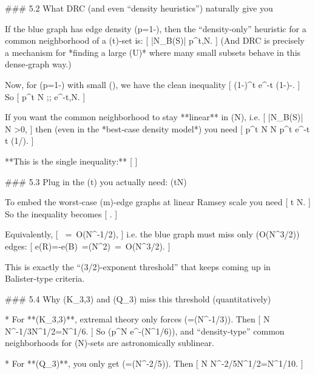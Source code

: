 ### 5.2 What DRC (and even “density heuristics”) naturally give you

If the blue graph has edge density (p=1-\varepsilon), then the “density‑only” heuristic for a common neighborhood of a (t)-set is:
[
|N_B(S)| \approx p^{t},N.
]
(And DRC is precisely a mechanism for *finding a large (U)* where many small subsets behave in this dense‑graph way.)

Now, for (p=1-\varepsilon) with small (\varepsilon), we have the clean inequality
[
(1-\varepsilon)^t \le e^{-\varepsilon t}
\quad{}\ln(1-\varepsilon)\le -\varepsilon\text{)}.
]
So
[
p^{t} N ;\le; e^{-\varepsilon t},N.
]

If you want the common neighborhood to stay **linear** in (N), i.e.
[
|N_B(S)| \ge \alpha N \quad{}\alpha>0,
]
then (even in the *best‑case density model*) you need
[
p^t N \gtrsim \alpha N
\quad\Longrightarrow\quad
p^t \gtrsim \alpha
\quad\Longrightarrow\quad
e^{-\varepsilon t}\gtrsim \alpha
\quad\Longrightarrow\quad
\varepsilon t \lesssim \log(1/\alpha).
]

**This is the single inequality:**
[
\qquad{}
]

### 5.3 Plug in the (t) you actually need: (t\asymp \sqrt N)

To embed the worst‑case (m)-edge graphs at linear Ramsey scale you need
[
t \asymp \sqrt N.
]
So the inequality becomes
[
.
]

Equivalently,
[
\varepsilon \ =\ O(N^{-1/2}),
]
i.e. the blue graph must miss only (O(N^{3/2})) edges:
[
e(R)=-e(B)\ =\Theta(\varepsilon N^2)\ =\ O(N^{3/2}).
]

This is exactly the “(3/2)-exponent threshold” that keeps coming up in Balister‑type criteria.

### 5.4 Why (K_{3,3}) and (Q_3) miss this threshold (quantitatively)

* For **(K_{3,3})**, extremal theory only forces (\varepsilon=\Theta(N^{-1/3})).
  Then
  [
  \varepsilon\sqrt N \asymp N^{-1/3}\cdot N^{1/2}=N^{1/6}\to\infty.
  ]
  So (p^{\sqrt N} \le e^{-\Theta(N^{1/6})}), and “density‑type” common neighborhoods for (\sqrt N)-sets are astronomically sublinear.

* For **(Q_3)**, you only get (\varepsilon=\Theta(N^{-2/5})).
  Then
  [
  \varepsilon\sqrt N \asymp N^{-2/5}\cdot N^{1/2}=N^{1/10}\to\infty.
  ]

